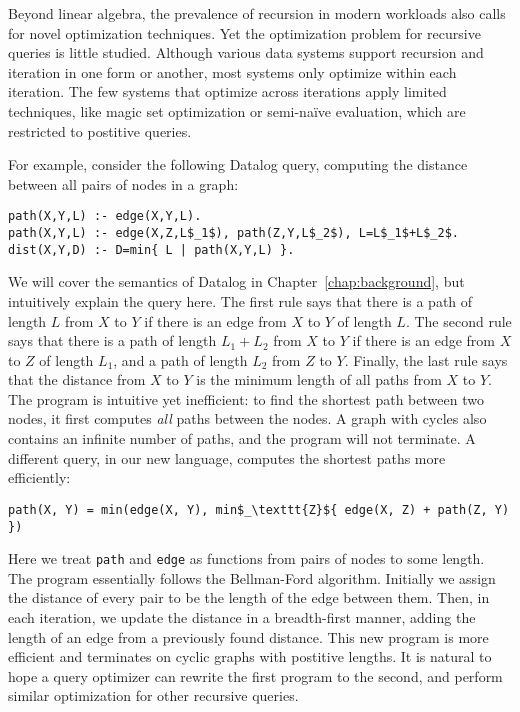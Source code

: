 Beyond linear algebra, 
 the prevalence of recursion in modern workloads
 also calls for novel optimization techniques.
Yet the optimization problem for recursive queries is little studied.
Although various data systems support recursion and iteration
 in one form or another, 
 most systems only optimize within each iteration.
The few systems that optimize across iterations
 apply limited techniques, like magic set optimization
 or semi-na\"ive evaluation,
 which are restricted to postitive queries.

For example, consider the following Datalog query, 
 computing the distance between all pairs of nodes in a graph: 
%
\begin{lstlisting}[mathescape=true]
path(X,Y,L) :- edge(X,Y,L).
path(X,Y,L) :- edge(X,Z,L$_1$), path(Z,Y,L$_2$), L=L$_1$+L$_2$.
dist(X,Y,D) :- D=min{ L | path(X,Y,L) }.
\end{lstlisting}
%
We will cover the semantics of Datalog in Chapter~\ref{chap:background},
 but intuitively explain the query here.
The first rule says that there is a path of length $L$ from $X$ to $Y$
 if there is an edge from $X$ to $Y$ of length $L$.
The second rule says that there is a path of length $L_1 + L_2$ from $X$ to $Y$
 if there is an edge from $X$ to $Z$ of length $L_1$,
 and a path of length $L_2$ from $Z$ to $Y$.
Finally, the last rule says that the distance from $X$ to $Y$ is the minimum
 length of all paths from $X$ to $Y$.
The program is intuitive yet inefficient:
 to find the shortest path between two nodes,
 it first computes {\em all} paths between the nodes.
A graph with cycles also contains an infinite number of paths,
 and the program will not terminate.
A different query, in our new \datalogo language, 
 computes the shortest paths more efficiently:
%
\begin{lstlisting}[mathescape=true]
path(X, Y) = min(edge(X, Y), min$_\texttt{Z}${ edge(X, Z) + path(Z, Y) })
\end{lstlisting}
%
Here we treat \lstinline|path| and \lstinline|edge| as functions
 from pairs of nodes to some length.
The program essentially follows the Bellman-Ford algorithm.
Initially we assign the distance of every pair to be the length of the edge between them. 
Then, in each iteration, we update the distance in a breadth-first manner,
 adding the length of an edge from a previously found distance. 
This new program is more efficient and terminates on cyclic graphs with postitive lengths.
It is natural to hope a query optimizer can rewrite the first program to the second,
 and perform similar optimization for other recursive queries.

